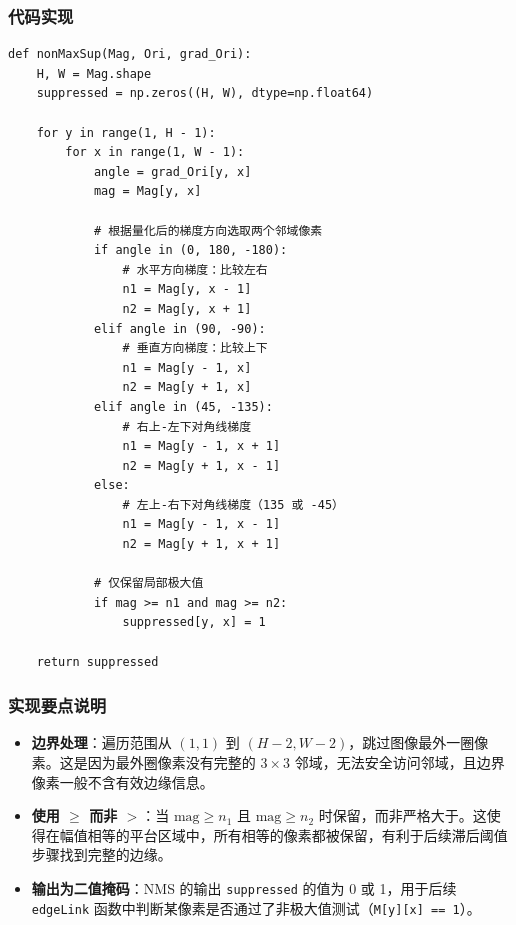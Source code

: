\documentclass[12pt,a4paper]{ctexart}
\begin{document}
\subsubsection{代码实现}

\begin{lstlisting}
def nonMaxSup(Mag, Ori, grad_Ori):
    H, W = Mag.shape
    suppressed = np.zeros((H, W), dtype=np.float64)

    for y in range(1, H - 1):
        for x in range(1, W - 1):
            angle = grad_Ori[y, x]
            mag = Mag[y, x]

            # 根据量化后的梯度方向选取两个邻域像素
            if angle in (0, 180, -180):
                # 水平方向梯度：比较左右
                n1 = Mag[y, x - 1]
                n2 = Mag[y, x + 1]
            elif angle in (90, -90):
                # 垂直方向梯度：比较上下
                n1 = Mag[y - 1, x]
                n2 = Mag[y + 1, x]
            elif angle in (45, -135):
                # 右上-左下对角线梯度
                n1 = Mag[y - 1, x + 1]
                n2 = Mag[y + 1, x - 1]
            else:
                # 左上-右下对角线梯度（135 或 -45）
                n1 = Mag[y - 1, x - 1]
                n2 = Mag[y + 1, x + 1]

            # 仅保留局部极大值
            if mag >= n1 and mag >= n2:
                suppressed[y, x] = 1

    return suppressed
\end{lstlisting}

\subsubsection{实现要点说明}

\begin{itemize}
  \item \textbf{边界处理}：遍历范围从 $(1, 1)$ 到 $(H-2, W-2)$，跳过图像最外一圈像素。这是因为最外圈像素没有完整的 $3 \times 3$ 邻域，无法安全访问邻域，且边界像素一般不含有效边缘信息。
  \item \textbf{使用 $\geq$ 而非 $>$}：当 $\text{mag} \geq n_1$ 且 $\text{mag} \geq n_2$ 时保留，而非严格大于。这使得在幅值相等的平台区域中，所有相等的像素都被保留，有利于后续滞后阈值步骤找到完整的边缘。
  \item \textbf{输出为二值掩码}：NMS 的输出 \texttt{suppressed} 的值为 0 或 1，用于后续 \texttt{edgeLink} 函数中判断某像素是否通过了非极大值测试（\texttt{M[y][x] == 1}）。
\end{itemize}
\end{document}
